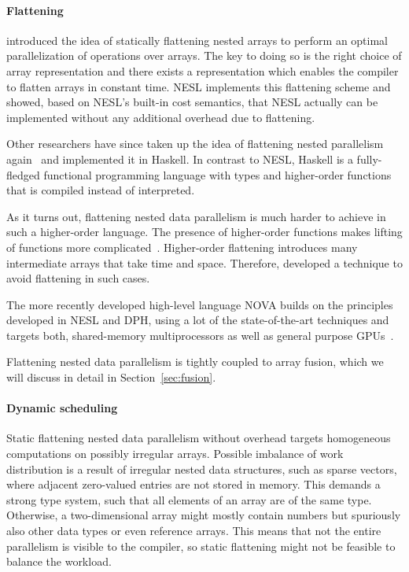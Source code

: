 \documentclass[a4paper]{article}
\begin{document}
\paragraph{Flattening}

\citet{Blelloch1993Implementation} introduced the idea of statically flattening nested arrays to perform an optimal parallelization of operations over arrays. The key to doing so is the right choice of array representation and there exists a representation which enables the compiler to flatten arrays in constant time. NESL implements this flattening scheme and \citet{Blelloch:1996:PTS:232627.232650} showed, based on NESL's built-in cost semantics, that NESL actually can be implemented without any additional overhead due to flattening.

Other researchers have since taken up the idea of flattening nested parallelism again~\cite{Lippmeier:2012:WEH:2364527.2364564} and implemented it in Haskell. In contrast to NESL, Haskell is a fully-fledged functional programming language with types and higher-order functions that is compiled instead of interpreted.

As it turns out, flattening nested data parallelism is much harder to achieve in such a higher-order language. The presence of higher-order functions makes lifting of functions more complicated~\cite{Lippmeier:2012:WEH:2364527.2364564}. Higher-order flattening introduces many intermediate arrays that take time and space. Therefore, \citet{Keller:2012:VA:2364506.2364512} developed a technique to avoid flattening in such cases.

The more recently developed high-level language NOVA builds on the principles developed in NESL and DPH, using a lot of the state-of-the-art techniques and targets both, shared-memory multiprocessors as well as general purpose GPUs~\cite{Collins:2014:NFL:2627373.2627375}.

Flattening nested data parallelism is tightly coupled to array fusion,
which we will discuss in detail in Section~\ref{sec:fusion}.

\paragraph{Dynamic scheduling}

Static flattening nested data parallelism without overhead targets homogeneous computations on possibly irregular arrays. Possible imbalance of work distribution is a result of irregular nested data structures, such as sparse vectors, where adjacent zero-valued entries are not stored in memory. This demands a strong type system, such that all elements of an array are of the same type. Otherwise, a two-dimensional array might mostly contain numbers but spuriously also other data types or even reference arrays. This means that not the entire parallelism is visible to the compiler, so static flattening might not be feasible to balance the workload.
\end{document}
